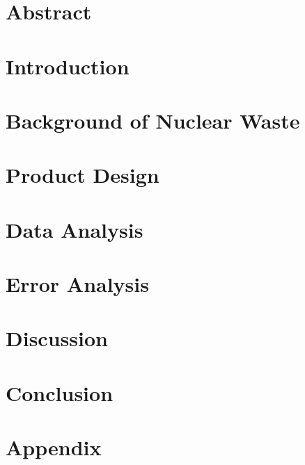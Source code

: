 \documentclass[12pt]{article}
\begin{document}

\section{Abstract}
\label{Abstract Section}


\section{Introduction}
\label{Introduction Section}


\section{Background of Nuclear Waste}
\label{Background of Nuclear Waste Section}


\section{Product Design}
\label{Product Design Section}


\section{Data Analysis}
\label{Data Analysis Section}


\section{Error Analysis}
\label{Error Analysis Section}


\section{Discussion}
\label{Discussion Section}


\section{Conclusion}
\label{Conclusion Section}


\newpage



\newpage
\section{Appendix}
\label{Appendix Section}

\end{document}
